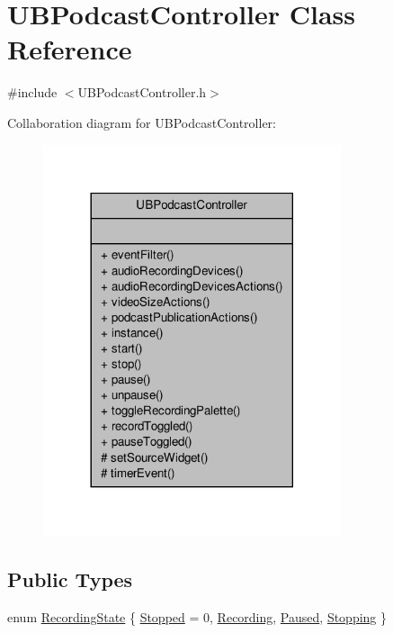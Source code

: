 \hypertarget{class_u_b_podcast_controller}{\section{U\-B\-Podcast\-Controller Class Reference}
\label{d9/def/class_u_b_podcast_controller}
}


{\ttfamily \#include $<$U\-B\-Podcast\-Controller.\-h$>$}



Collaboration diagram for U\-B\-Podcast\-Controller\-:
\nopagebreak
\begin{figure}[H]
\begin{center}
\leavevmode
\includegraphics[width=248pt]{d3/d1d/class_u_b_podcast_controller__coll__graph}
\end{center}
\end{figure}
\subsection*{Public Types}
\begin{DoxyCompactItemize}
\item 
enum \hyperlink{class_u_b_podcast_controller_a8d0cf82737deae51ef72eaea4797c3a8}{Recording\-State} \{ \hyperlink{class_u_b_podcast_controller_a8d0cf82737deae51ef72eaea4797c3a8ac0075b65559901d25e6c3b1d1af1bc49}{Stopped} =  0, 
\hyperlink{class_u_b_podcast_controller_a8d0cf82737deae51ef72eaea4797c3a8a7926bf03db770861fb8b65bd812caf6a}{Recording}, 
\hyperlink{class_u_b_podcast_controller_a8d0cf82737deae51ef72eaea4797c3a8a57f2bd0099852e082a6ab2b7601dbb11}{Paused}, 
\hyperlink{class_u_b_podcast_controller_a8d0cf82737deae51ef72eaea4797c3a8a28452d1733f15a65a388eb763d2fe4d7}{Stopping}
 \}
\end{DoxyCompactItemize}
